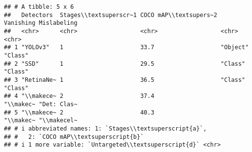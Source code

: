 \begin{verbatim}
## # A tibble: 5 x 6
##   Detectors  Stages\\textsuperscr~1 COCO mAP\\textsupers~2 Vanishing Mislabeling
##   <chr>      <chr>                  <chr>                  <chr>     <chr>      
## 1 "YOLOv3"   1                      33.7                   "Object"  "Class"    
## 2 "SSD"      1                      29.5                   "Class"   "Class"    
## 3 "RetinaNe~ 1                      36.5                   "Class"   "Class"    
## 4 "\\makece~ 2                      37.4                   "\\makec~ "Det: Clas~
## 5 "\\makece~ 2                      40.3                   "\\makec~ "\\makecel~
## # i abbreviated names: 1: `Stages\\textsuperscript{a}`,
## #   2: `COCO mAP\\textsuperscript{b}`
## # i 1 more variable: `Untargeted\\textsuperscript{d}` <chr>
\end{verbatim}

